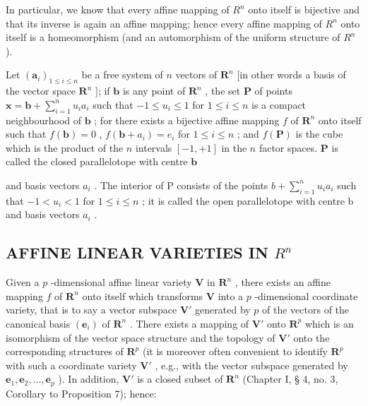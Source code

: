 In particular, we know that every affine mapping of \(R^{n}\) onto itself is bijective and that its inverse is again an affine mapping; hence every affine mapping of \(R^{n}\) onto itself is a homeomorphism (and an automorphism of the uniform structure of \(R^{n}\) ).

Let \((\pmb{a}_i)_{1\leqslant i\leqslant n}\) be a free system of \(n\) vectors of \(\mathbf{R}^n\) {[}in other words a basis of the vector space \(\mathbf{R}^n\) {]}; if \(\pmb{b}\) is any point of \(\mathbf{R}^n\) , the set \(\mathbf{P}\) of points \(\pmb{x} = \pmb{b} + \sum_{i=1}^{n} u_i a_i\) such that \(-1 \leqslant u_i \leqslant 1\) for \(1 \leqslant i \leqslant n\) is a compact neighbourhood of \(\pmb{b}\) ; for there exists a bijective affine mapping \(f\) of \(\mathbf{R}^n\) onto itself such that \(f(\pmb{b}) = 0\) , \(f(\pmb{b} + a_i) = e_i\) for \(1 \leqslant i \leqslant n\) ; and \(f(\mathbf{P})\) is the cube which is the product of the \(n\) intervals \([-1, +1]\) in the \(n\) factor spaces. \(\mathbf{P}\) is called the closed parallelotope with centre \(\pmb{b}\)

and basis vectors \(a_{i}\) . The interior of P consists of the points \(b + \sum_{i=1}^{n} u_{i} a_{i}\) such that \(-1 < u_{i} < 1\) for \(1 \leqslant i \leqslant n\) ; it is called the open parallelotope with centre b and basis vectors \(a_{i}\) .

\subsection{\texorpdfstring{AFFINE LINEAR VARIETIES IN \(R^{n}\)}{AFFINE LINEAR VARIETIES IN R TO THE N}}

Given a \(p\) -dimensional affine linear variety \(\mathbf{V}\) in \(\mathbf{R}^n\) , there exists an affine mapping \(f\) of \(\mathbf{R}^n\) onto itself which transforms \(\mathbf{V}\) into a \(p\) -dimensional coordinate variety, that is to say a vector subspace \(\mathbf{V}'\) generated by \(p\) of the vectors of the canonical basis \((\boldsymbol{e}_i)\) of \(\mathbf{R}^n\) . There exists a mapping of \(\mathbf{V}'\) onto \(\mathbf{R}^p\) which is an isomorphism of the vector space structure and the topology of \(\mathbf{V}'\) onto the corresponding structures of \(\mathbf{R}^p\) (it is moreover often convenient to identify \(\mathbf{R}^p\) with such a coordinate variety \(\mathbf{V}'\) , e.g., with the vector subspace generated by \(\boldsymbol{e}_1, \boldsymbol{e}_2, \ldots, \boldsymbol{e}_p\) ). In addition, \(\mathbf{V}'\) is a closed subset of \(\mathbf{R}^n\) (Chapter I, § 4, no. 3, Corollary to Proposition 7); hence:

